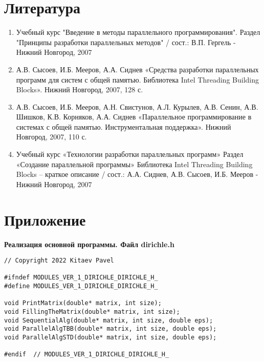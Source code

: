\documentclass{report}
\begin{document}
\section*{Литература}
\begin{enumerate}
\item Учебный курс "Введение в методы параллельного
программирования". Раздел "Принципы разработки параллельных методов"  / сост.: В.П. Гергель - Нижний Новгород, 2007 
\item А.В. Сысоев, И.Б. Мееров, А.А. Сиднев «Средства разработки параллельных программ для систем с общей памятью. Библиотека Intel Threading Building Blocks». Нижний Новгород, 2007, 128 с. 
\item А.В. Сысоев, И.Б. Мееров, А.Н. Свистунов, А.Л. Курылев, А.В. Сенин, А.В. Шишков, К.В. Корняков, А.А. Сиднев «Параллельное программирование в системах с общей
памятью. Инструментальная поддержка». Нижний Новгород, 2007, 110 с. 
\item Учебный курс «Технологии разработки параллельных программ» Раздел «Создание параллельной программы» Библиотека Intel Threading Building Blocks – краткое описание / сост.: А.А. Сиднев, А.В. Сысоев, И.Б. Мееров - Нижний Новгород, 2007

\end{enumerate} 
\newpage

\section*{Приложение}
\textbf{ Реализация основной программы. Файл dirichle.h}
\begin{lstlisting}
// Copyright 2022 Kitaev Pavel

#ifndef MODULES_VER_1_DIRICHLE_DIRICHLE_H_
#define MODULES_VER_1_DIRICHLE_DIRICHLE_H_

void PrintMatrix(double* matrix, int size);
void FillingTheMatrix(double* matrix, int size);
void SequentialAlg(double* matrix, int size, double eps);
void ParallelAlgTBB(double* matrix, int size, double eps);
void ParallelAlgSTD(double* matrix, int size, double eps);

#endif  // MODULES_VER_1_DIRICHLE_DIRICHLE_H_
\end{lstlisting}

\newpage
\end{document}
